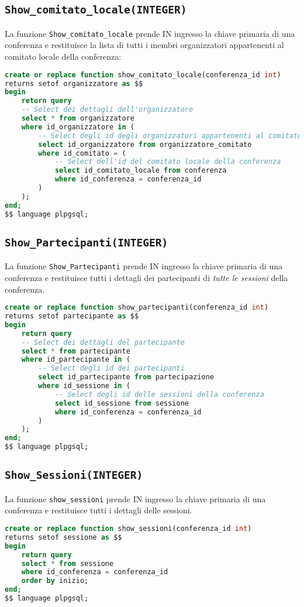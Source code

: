 \subsection{\texttt{Show\_comitato\_locale(INTEGER)}}
La funzione \texttt{Show\_comitato\_locale} prende IN ingresso la chiave primaria di una conferenza e restituisce la lista di tutti i membri organizzatori appartenenti al comitato locale della conferenza:
\begin{lstlisting}[language=SQL, style=mystyle]
create or replace function show_comitato_locale(conferenza_id int)
returns setof organizzatore as $$
begin
    return query
    -- Select dei dettagli dell'organizzatore
    select * from organizzatore
    where id_organizzatore in (
        -- Select degli id degli organizzatori appartenenti al comitato locale
        select id_organizzatore from organizzatore_comitato
        where id_comitato = (
            -- Select dell'id del comitato locale della conferenza
            select id_comitato_locale from conferenza
            where id_conferenza = conferenza_id
        )
    );
end;
$$ language plpgsql;
\end{lstlisting}
\subsection{\texttt{Show\_Partecipanti(INTEGER)}}
La funzione \texttt{Show\_Partecipanti} prende IN ingresso la chiave primaria di una conferenza e restituisce tutti i dettagli dei partecipanti di \textit{tutte le sessioni} della conferenza.
\begin{lstlisting}[language=SQL,style=mystyle]
create or replace function show_partecipanti(conferenza_id int)
returns setof partecipante as $$
begin
    return query
    -- Select dei dettagli del partecipante
    select * from partecipante
    where id_partecipante in (
        -- Select degli id dei partecipanti
        select id_partecipante from partecipazione
        where id_sessione in (
            -- Select degli id delle sessioni della conferenza
            select id_sessione from sessione
            where id_conferenza = conferenza_id
        )
    );
end;
$$ language plpgsql;
\end{lstlisting}
\subsection{\texttt{Show\_Sessioni(INTEGER)}}
La funzione \texttt{show\_sessioni} prende IN ingresso la chiave primaria di una conferenza e restituisce tutti i dettagli delle sessioni.
\begin{lstlisting}[language=SQL, style=mystyle]
create or replace function show_sessioni(conferenza_id int)
returns setof sessione as $$
begin
    return query
    select * from sessione
    where id_conferenza = conferenza_id
    order by inizio;
end;
$$ language plpgsql;
\end{lstlisting}
